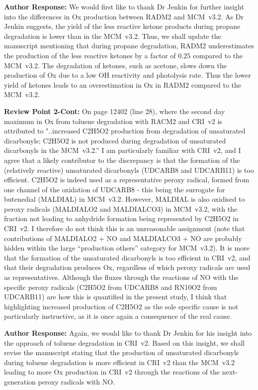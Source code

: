 \documentclass{article}
\begin{document}
\textbf{Author Response:} We would first like to thank Dr Jenkin for further insight into the differences in Ox production between RADM2 and MCM~v3.2. 
As Dr Jenkin suggests, the yield of the less reactive ketone products during propane degradation is lower than in the MCM~v3.2.
Thus, we shall update the manuscript mentioning that during propane degradation, RADM2 underestimates the production of the less reactive ketones by a factor of $0.25$ compared to the MCM~v3.2.
The degradation of ketones, such as acetone, slows down the production of Ox due to a low OH reactivity and photolysis rate.
Thus the lower yield of ketones leads to an overestimation in Ox in RADM2 compared to the MCM~v3.2.

\textbf{Review Point 2-Cont:} On page 12402 (line 28), where the second day maximum in Ox from toluene degradation with RACM2 and CRI~v2 is attributed to "..increased C2H5O2 production from degradation of unsaturated dicarbonyls; C2H5O2 is not produced during degradation of unsaturated dicarbonyls in the MCM~v3.2.'' I am particularly familiar with CRI~v2, and I agree that a likely contributor to the discrepancy is that the formation of the (relatively reactive) unsaturated dicarbonyls (UDCARB8 and UDCARB11) is too efficient. C2H5O2 is indeed used as a representative peroxy radical, formed from one channel of the oxidation of UDCARB8 - this being the surrogate for butenedial (MALDIAL) in MCM~v3.2. However, MALDIAL is also oxidised to peroxy radicals (MALDIALO2 and MALDIALCO3) in MCM~v3.2, with the fraction not leading to anhydride formation being represented by C2H5O2 in CRI~v2. I therefore do not think this is an unreasonable assignment (note that contributions of MALDIALO2 + NO and MALDIALCO3 + NO are probably hidden within the large ``production others'' category for MCM~v3.2). It is more that the formation of the unsaturated dicarbonyls is too efficient in CRI~v2, and that their degradation produces Ox, regardless of which peroxy radicals are used as representatives. Although the fluxes through the reactions of NO with the specific peroxy radicals (C2H5O2 from UDCARB8 and RN10O2 from UDCARB11) are how this is quantified in the present study, I think that highlighting increased production of C2H5O2 as the sole specific cause is not particularly instructive, as it is once again a consequence of the real cause.

\textbf{Author Response:} Again, we would like to thank Dr Jenkin for his insight into the approach of toluene degradation in CRI~v2.
Based on this insight, we shall revise the manuscript stating that the production of unsaturated dicarbonyls during toluene degradation is more efficient in CRI~v2 than the MCM~v3.2 leading to more Ox production in CRI~v2 through the reactions of the next-generation peroxy radicals with NO.
\end{document}
